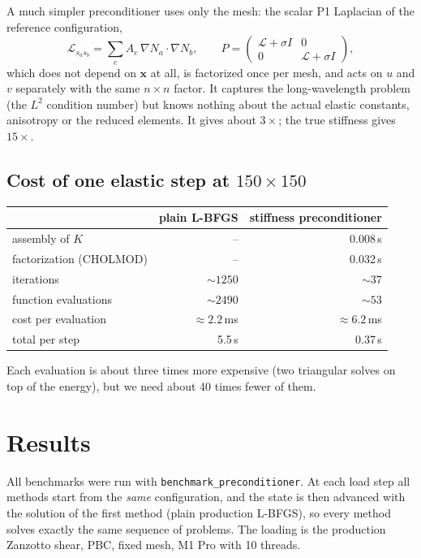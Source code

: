 \documentclass[11pt,a4paper]{article}
\theoremstyle{remark}
\newcommand{\x}{\bm{x}}
\newcommand{\code}[1]{\texttt{#1}}
\begin{document}
A much simpler preconditioner uses only the mesh: the scalar P1 Laplacian of the reference
configuration,
\begin{equation}
\mathcal{L}_{s_a s_b} = \sum_e A_e\,\nabla N_a\cdot\nabla N_b,\qquad
P = \begin{pmatrix}\mathcal{L}+\sigma I & 0\\ 0&\mathcal{L}+\sigma I\end{pmatrix},
\end{equation}
which does not depend on $\x$ at all, is factorized once per mesh, and acts on $u$ and $v$
separately with the same $n\times n$ factor. It captures the long-wavelength problem (the
$L^2$ condition number) but knows nothing about the actual elastic constants, anisotropy or
the reduced elements. It gives about $3\times$; the true stiffness gives $15\times$.

\subsection{Cost of one elastic step at $150\times150$}

\begin{center}
\begin{tabular}{lrr}
\toprule
& plain L-BFGS & stiffness preconditioner \\
\midrule
assembly of $K$ & -- & 0.008\,s \\
factorization (CHOLMOD) & -- & 0.032\,s \\
iterations & $\sim1250$ & $\sim37$ \\
function evaluations & $\sim2490$ & $\sim53$ \\
cost per evaluation & $\approx2.2$\,ms & $\approx6.2$\,ms \\
\midrule
total per step & 5.5\,s & 0.37\,s \\
\bottomrule
\end{tabular}
\end{center}
Each evaluation is about three times more expensive (two triangular solves on top of the
energy), but we need about 40 times fewer of them.

\section{Results}

All benchmarks were run with \code{benchmark\_\allowbreak{}preconditioner}. At each load step all methods
start from the \emph{same} configuration, and the state is then advanced with the solution of
the first method (plain production L-BFGS), so every method solves exactly the same sequence of
problems. The loading is the production Zanzotto shear, PBC, fixed mesh, M1 Pro with 10 threads.
\end{document}
